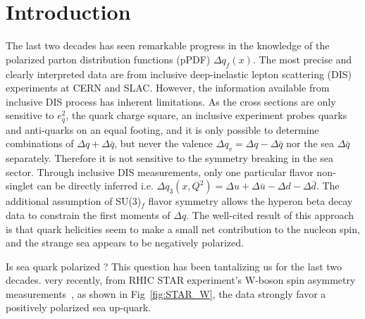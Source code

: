 
\section{Introduction}
\label{sec:introduction}
The last two decades has seen remarkable progress in the knowledge 
of the polarized parton distribution functions (pPDF)
  $\Delta q_f(x)$.
The most precise and clearly interpreted data are from inclusive deep-inelastic
 lepton scattering (DIS)
experiments at CERN and SLAC. 
However, the information available from inclusive DIS process has inherent 
limitations.  As the cross 
sections are only sensitive to $e_q^2$, the quark charge square,
an inclusive experiment probes quarks and anti-quarks on an equal footing, and
 it is only possible to determine combinations of $\Delta q + \Delta \bar{q}$, 
but never the valence $\Delta q_v=\Delta q - \Delta \bar{q}$ nor the sea $\Delta \bar{q}$ separately.    
 Therefore it is not sensitive to the symmetry breaking in the sea sector. 
Through inclusive DIS measurements, only one particular flavor non-singlet can be directly 
inferred  i.e.  $\Delta q_{3}(x,Q^2)=\Delta u+\Delta \bar{u}-\Delta d-\Delta \bar{d}$. 
The additional assumption of SU(3)$_f$ flavor symmetry allows the hyperon beta decay data
to constrain the first moments of $\Delta q$.
The well-cited result of this approach is
that quark helicities seem to make a small net contribution to the nucleon spin, and the
strange sea appears to be negatively polarized.

Is sea quark polarized ?  This question has been tantalizing us for the last  two decades.  very recently, from RHIC STAR experiment's W-boson spin asymmetry measurements~\cite{Adamczyk:2014xyw}, as shown in Fig~\ref{fig:STAR_W}, the data strongly favor a positively polarized sea up-quark.  

